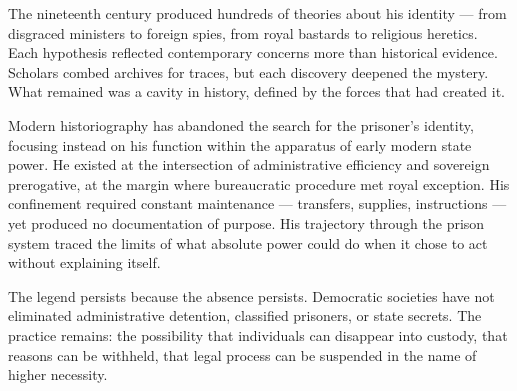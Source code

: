 The nineteenth century produced hundreds of theories about his identity — from disgraced ministers to foreign spies, from royal bastards to religious heretics. Each hypothesis reflected contemporary concerns more than historical evidence. Scholars combed archives for traces, but each discovery deepened the mystery. What remained was a cavity in history, defined by the forces that had created it.

Modern historiography has abandoned the search for the prisoner's identity, focusing instead on his function within the apparatus of early modern state power. He existed at the intersection of administrative efficiency and sovereign prerogative, at the margin where bureaucratic procedure met royal exception. His confinement required constant maintenance — transfers, supplies, instructions — yet produced no documentation of purpose. His trajectory through the prison system traced the limits of what absolute power could do when it chose to act without explaining itself.

The legend persists because the absence persists. Democratic societies have not eliminated administrative detention, classified prisoners, or state secrets. The practice remains: the possibility that individuals can disappear into custody, that reasons can be withheld, that legal process can be suspended in the name of higher necessity. 

